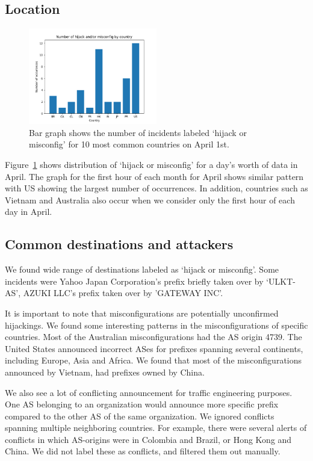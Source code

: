 \subsection{Location}
 \begin{figure}
	\includegraphics[width=0.5\textwidth]{Occurences_by_country_2.png}
	\caption{Bar graph shows the number of incidents labeled `hijack or misconfig' for 10 most common countries on April 1st.}
	\label{fig:conflict_country}
\end{figure}
Figure~\ref{fig:conflict_country} shows distribution of `hijack or misconfig' for a day's worth of data in April. The graph for the first hour of each month for April shows similar pattern with US showing the largest number of occurrences. In addition, countries such as Vietnam and Australia also occur when we consider only the first hour of each day in April. 
\subsection{Common destinations and attackers}
We found wide range of destinations labeled as `hijack or misconfig'. Some incidents were Yahoo Japan Corporation's prefix briefly taken over by `ULKT-AS',  AZUKI LLC's prefix taken over by 'GATEWAY INC'. 

It is important to note that misconfigurations are potentially unconfirmed hijackings. We found some interesting patterns in the misconfigurations of specific countries. Most of the Australian misconfigurations had the AS origin 4739. The United States announced incorrect ASes for prefixes spanning several continents, including Europe, Asia and Africa. We found that most of the misconfigurations announced by Vietnam, had prefixes owned by China. 

We also see a lot of conflicting announcement for traffic engineering purposes. One AS belonging to an organization would announce more specific prefix compared to the other AS of the same organization. We ignored conflicts spanning multiple neighboring countries. For example, there were several alerts of conflicts in which AS-origins were in Colombia and Brazil, or Hong Kong and China. We did not label these as conflicts, and filtered them out manually.

